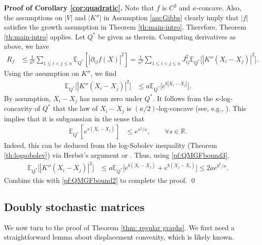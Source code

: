 \documentclass[11pt,reqno]{amsart}
\numberwithin{equation}{section}
\theoremstyle{definition}
\def\E{{\mathbb E}}
\def\R{{\mathbb R}}
\begin{document}
\noindent\textbf{Proof of Corollary \ref{cor:quadratic}.}
Note that $f$ is $C^2$ and $\kappa$-concave.
	Also, the assumptions on $ |V|$ and $| K'' |$ in Assumption \ref{ass:Gibbs} clearly imply that $ |f| $ satisfies the growth assumption in Theorem \ref{th:main-intro}.
	 Therefore, Theorem \ref{th:main-intro} applies. Let $Q^*$ be given as therein. Computing derivatives as above, we have
\begin{align}
	R_f & \le  \frac{1}{\kappa^2}\sum_{1 \le i < j \le n}\E_{Q^*}[|\partial_{ij}f(X)|^2] = \frac{1}{\kappa^2}\sum_{1 \le i < j \le n}J_{ij}^2\E_{Q^*}\big[|K''(X_i-X_j)|^2\big]. \label{pf:QMGFbound2}
\end{align}
Using the assumption on $K''$, we find
\begin{align}
	\E_{Q^*}\big[|K''(X_i-X_j)|^2\big] &\le a\E_{Q^*}\big[e^{b|X_i-X_j|}\big] . \label{pf:QMGFbound3}
\end{align}
By assumption, $X_i-X_j$ has mean zero under $Q^*$.
It follows from the $\kappa$-log-concavity of  $Q^*$ that the law of $X_i-X_j$ is $(\kappa/2)$-log-concave (see, e.g.,  \cite[Theorem 3.7(a) and Theorem 3.8]{saumard2014log}).
This implies that it is subgaussian in the sense that
\begin{align*}
	\E_{Q^*}[e^{s(X_i-X_j)}] &\le e^{s^2/\kappa }, \qquad \forall s \in \R.
\end{align*}
Indeed, this can be deduced from the  log-Sobolev inequality (Theorem \ref{th:logsobolev}) via Herbst's argument or \cite[Theorem 1.3]{bobkov1999exponential}.
Thus, using \eqref{pf:QMGFbound3}, %
\begin{align*}
	\E_{Q^*}\big[|K''(X_i-X_j)|^2\big] &\le  a\E_{Q^*}\big[e^{b(X_i-X_j)}+e^{b(X_j-X_i)}\big] \le 2ae^{b^2/\kappa}.
\end{align*}
Combine this with \eqref{pf:QMGFbound2} to complete the proof.
\hfill \qed



\subsection{Doubly stochastic matrices}
We now turn to the proof of Theorem \ref{thm: regular graphs}. We first need a straightforward lemma about displacement convexity, which is likely known. 
\end{document}
